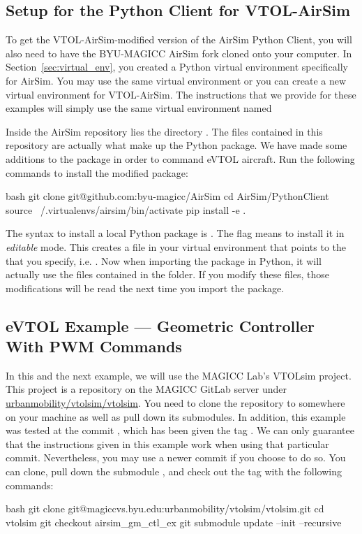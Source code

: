 \subsection{Setup for the Python Client for VTOL-AirSim}
To get the VTOL-AirSim-modified version of the AirSim Python Client, you will also need to have the BYU-MAGICC AirSim fork cloned onto your computer. In Section~\ref{sec:virtual_env}, you created a Python virtual environment specifically for AirSim. You may use the same virtual environment or you can create a new virtual environment for VTOL-AirSim. The instructions that we provide for these examples will simply use the same virtual environment named 

Inside the AirSim repository lies the directory . The files contained in this repository are actually what make up the  Python package. We have made some additions to the package in order to command eVTOL aircraft. Run the following commands to install the modified package:
\begin{minttcb}[title={Install the \texttt{airsim} Python Package from the BYU-MAGICC Fork}]{bash}
git clone git@github.com:byu-magicc/AirSim
cd AirSim/PythonClient
source ~/.virtualenvs/airsim/bin/activate
pip install -e .
\end{minttcb}

The syntax to install a local Python package is . The  flag means to install it in \textit{editable} mode. This creates a file in your virtual environment that points to the  that you specify, i.e. . Now when importing the  package in Python, it will actually use the files contained in the  folder. If you modify these files, those modifications will be read the next time you import the package.

\subsection{eVTOL Example --- Geometric Controller With PWM Commands}\label{sec:vtol_geometric_control}
In this and the next example, we will use the MAGICC Lab's VTOLsim project. This project is a repository on the MAGICC GitLab server under \url{urbanmobility/vtolsim/vtolsim}. You need to clone the repository to somewhere on your machine as well as pull down its submodules. In addition, this example was tested at the commit , which has been given the tag . We can only guarantee that the instructions given in this example work when using that particular commit. Nevertheless, you may use a newer commit if you choose to do so. You can clone, pull down the submodule , and check out the tag  with the following commands:
\begin{minttcb}[title={Commands to Get the VTOLsim Repository}]{bash}
git clone git@magiccvs.byu.edu:urbanmobility/vtolsim/vtolsim.git
cd vtolsim
git checkout airsim_gm_ctl_ex
git submodule update --init --recursive
\end{minttcb}

